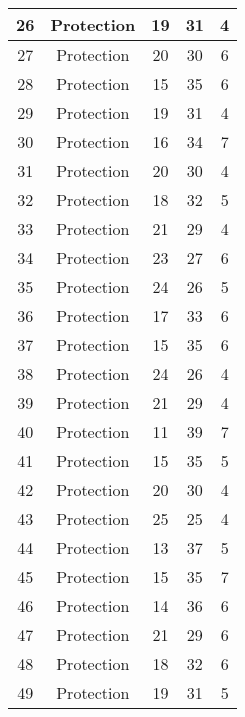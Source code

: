 \documentclass[results.tex]{subfiles}
\begin{document}
\begin{center}
\begin{tabular}{| c || c | c | c | c |}
    \hline
    26 & Protection & 19 & 31 & 4 \\ 
    \hline
    27 & Protection & 20 & 30 & 6 \\ 
    \hline
    28 & Protection & 15 & 35 & 6 \\ 
    \hline
    29 & Protection & 19 & 31 & 4 \\ 
    \hline
    30 & Protection & 16 & 34 & 7 \\ 
    \hline
    31 & Protection & 20 & 30 & 4 \\ 
    \hline
    32 & Protection & 18 & 32 & 5 \\ 
    \hline
    33 & Protection & 21 & 29 & 4 \\ 
    \hline
    34 & Protection & 23 & 27 & 6 \\ 
    \hline
    35 & Protection & 24 & 26 & 5 \\ 
    \hline
    36 & Protection & 17 & 33 & 6 \\ 
    \hline
    37 & Protection & 15 & 35 & 6 \\ 
    \hline
    38 & Protection & 24 & 26 & 4 \\ 
    \hline
    39 & Protection & 21 & 29 & 4 \\ 
    \hline
    40 & Protection & 11 & 39 & 7 \\ 
    \hline
    41 & Protection & 15 & 35 & 5 \\ 
    \hline
    42 & Protection & 20 & 30 & 4 \\ 
    \hline
    43 & Protection & 25 & 25 & 4 \\ 
    \hline
    44 & Protection & 13 & 37 & 5 \\ 
    \hline
    45 & Protection & 15 & 35 & 7 \\ 
    \hline
    46 & Protection & 14 & 36 & 6 \\ 
    \hline
    47 & Protection & 21 & 29 & 6 \\ 
    \hline
    48 & Protection & 18 & 32 & 6 \\ 
    \hline
    49 & Protection & 19 & 31 & 5 \\ 
    \hline   \end{tabular}
\end{center}
\end{document}
